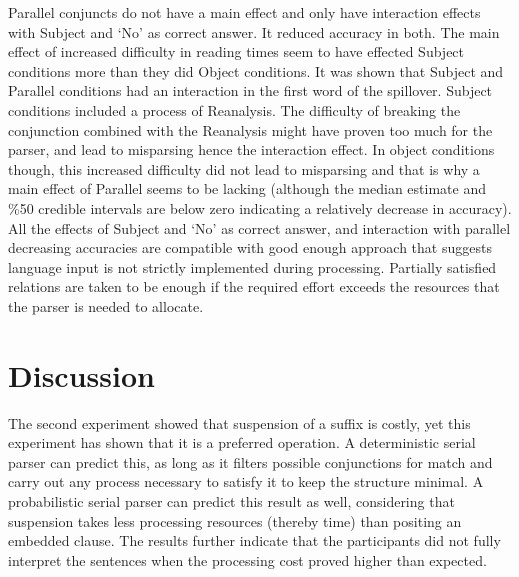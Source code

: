 Parallel conjuncts do not have a main effect and only have interaction effects with Subject and `No' as correct answer. It reduced accuracy in both. The main effect of increased difficulty in reading times seem to have effected Subject conditions more than they did Object conditions. It was shown that Subject and Parallel conditions had an interaction in the first word of the spillover. Subject conditions included a process of Reanalysis. The difficulty of breaking the conjunction combined with the Reanalysis might have proven too much for the parser, and lead to misparsing hence the interaction effect. In object conditions though, this increased difficulty did not lead to misparsing and that is why a main effect of Parallel seems to be lacking (although the median estimate and \%50 credible intervals are below zero indicating a relatively decrease in accuracy). All the effects of Subject and `No' as correct answer, and interaction with parallel decreasing accuracies are compatible with good enough approach \citep{ferreira2001misinterpretations,ferreira2007good} that suggests language input is not strictly implemented during processing. Partially satisfied relations are taken to be enough if the required effort exceeds the resources that the parser is needed to allocate. 


\section{Discussion}

The second experiment showed that suspension of a suffix is costly, yet this experiment has shown that it is a preferred operation. A deterministic serial parser can predict this, as long as it filters possible conjunctions for {\Case} match and carry out any process necessary to satisfy it to keep the structure minimal. A probabilistic serial parser can predict this result as well, considering that suspension takes less processing resources (thereby time) than positing an embedded clause. The results further indicate that the participants did not fully interpret the sentences when the processing cost proved higher than expected.

